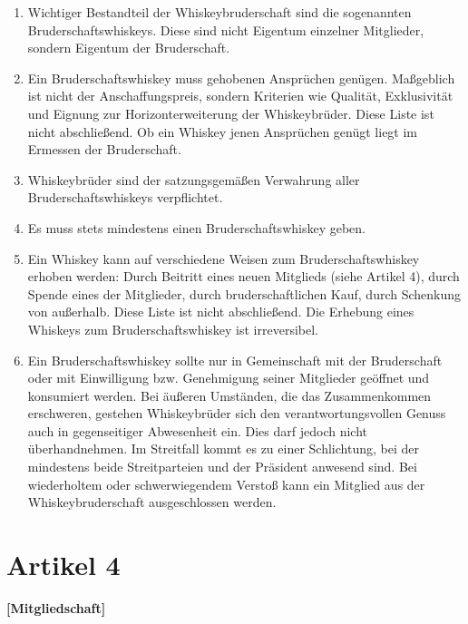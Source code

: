 \documentclass[a4paper,12pt]{article}
\begin{document}
\begin{enumerate}

\item Wichtiger Bestandteil der Whiskeybruderschaft sind die sogenannten Bruderschaftswhiskeys.
  Diese sind nicht Eigentum einzelner Mitglieder, sondern Eigentum der Bruderschaft.

\item Ein Bruderschaftswhiskey muss gehobenen Ansprüchen genügen. Maßgeblich ist nicht der
  Anschaffungspreis, sondern Kriterien wie Qualität, Exklusivität und Eignung zur
  Horizonterweiterung der Whiskeybrüder. Diese Liste ist nicht abschließend. Ob ein Whiskey jenen
  Ansprüchen genügt liegt im Ermessen der Bruderschaft.

\item Whiskeybrüder sind der satzungsgemäßen Verwahrung aller Bruderschaftswhiskeys verpflichtet.

\item Es muss stets mindestens einen Bruderschaftswhiskey geben.

\item Ein Whiskey kann auf verschiedene Weisen zum Bruderschaftswhiskey erhoben werden: Durch
  Beitritt eines neuen Mitglieds (siehe Artikel 4), durch Spende eines der Mitglieder, durch
  bruderschaftlichen Kauf, durch Schenkung von außerhalb. Diese Liste ist nicht abschließend. Die
  Erhebung eines Whiskeys zum Bruderschaftswhiskey ist irreversibel.

\item Ein Bruderschaftswhiskey sollte nur in Gemeinschaft mit der Bruderschaft oder mit Einwilligung
  bzw. Genehmigung seiner Mitglieder geöffnet und konsumiert werden. Bei äußeren Umständen, die das
  Zusammenkommen erschweren, gestehen Whiskeybrüder sich den verantwortungsvollen Genuss auch in
  gegenseitiger Abwesenheit ein. Dies darf jedoch nicht überhandnehmen. Im Streitfall kommt es zu
  einer Schlichtung, bei der mindestens beide Streitparteien und der Präsident anwesend sind. Bei
  wiederholtem oder schwerwiegendem Verstoß kann ein Mitglied aus der Whiskeybruderschaft
  ausgeschlossen werden.

\end{enumerate}



\section*{Artikel 4}
\textbf{[Mitgliedschaft]}
\end{document}
